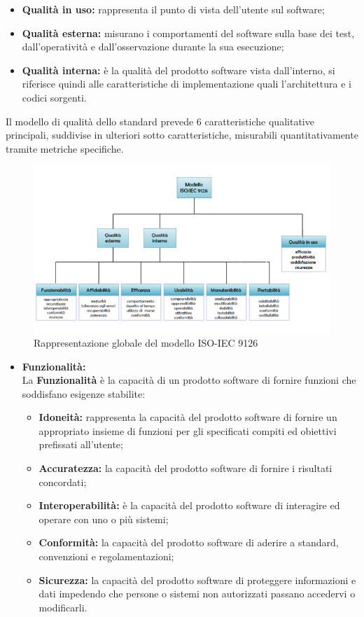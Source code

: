\begin{flushleft}
\begin{itemize}
	\item \textbf{Qualità in uso:} rappresenta il punto di vista dell'utente sul software;
	\item \textbf{Qualità esterna:} misurano i comportamenti del software sulla base dei test, dall'operatività e dall'osservazione durante la sua esecuzione;
	\item \textbf{Qualità interna:} è la qualità del prodotto software vista dall'interno, si riferisce quindi alle caratteristiche di implementazione quali l'architettura e i codici sorgenti.
\end{itemize}

Il modello di qualità dello standard prevede 6 caratteristiche qualitative principali, suddivise in ulteriori sotto caratteristiche, misurabili quantitativamente tramite metriche specifiche.

\begin{figure}[h]
\centering
\includegraphics[width=0.7\linewidth]{img/ISO_IEC_9126}
\caption[Rappresentazione globale del modello ISO-IEC 9126]{Rappresentazione globale del modello ISO-IEC 9126}
\label{fig:ISO_IEC_9126}
\end{figure}


\begin{itemize}
\item \textbf{Funzionalità:}\\
La \textbf{Funzionalità} è la capacità di un prodotto software di fornire funzioni che soddisfano esigenze stabilite:

\begin{itemize}
	\item \textbf{Idoneità:}  rappresenta la capacità del prodotto software di fornire un appropriato insieme di funzioni per gli specificati compiti ed obiettivi prefissati all'utente;
	\item \textbf{Accuratezza:} la capacità del prodotto software di fornire i risultati concordati;
	\item \textbf{Interoperabilità:} è la capacità del prodotto software di interagire ed operare con uno o più sistemi;
	\item \textbf{Conformità:} la capacità del prodotto software di aderire a standard, convenzioni e regolamentazioni;
	\item \textbf{Sicurezza:} la capacità del prodotto software di proteggere informazioni e dati impedendo che persone o sistemi non autorizzati passano accedervi o modificarli.
\end{itemize}


\end{itemize}
\end{flushleft}
